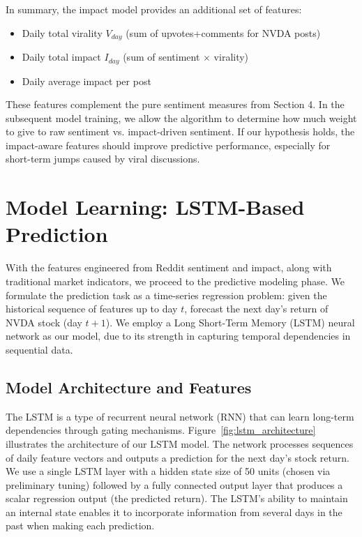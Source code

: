 \documentclass[conference]{IEEEtran}
\begin{document}
In summary, the impact model provides an additional set of features:
\begin{itemize}
	\item Daily total virality $V_{day}$ (sum of upvotes+comments for NVDA posts)
	\item Daily total impact $I_{day}$ (sum of sentiment $\times$ virality)
	\item Daily average impact per post
\end{itemize}
These features complement the pure sentiment measures from Section 4. In the subsequent model training, we allow the algorithm to determine how much weight to give to raw sentiment vs. impact-driven sentiment. If our hypothesis holds, the impact-aware features should improve predictive performance, especially for short-term jumps caused by viral discussions.

\section{Model Learning: LSTM-Based Prediction}
With the features engineered from Reddit sentiment and impact, along with traditional market indicators, we proceed to the predictive modeling phase. We formulate the prediction task as a time-series regression problem: given the historical sequence of features up to day $t$, forecast the next day’s return of NVDA stock (day $t+1$). We employ a Long Short-Term Memory (LSTM) neural network as our model, due to its strength in capturing temporal dependencies in sequential data.

\subsection{Model Architecture and Features}
The LSTM is a type of recurrent neural network (RNN) that can learn long-term dependencies through gating mechanisms. Figure~\ref{fig:lstm_architecture} illustrates the architecture of our LSTM model. The network processes sequences of daily feature vectors and outputs a prediction for the next day’s stock return. We use a single LSTM layer with a hidden state size of 50 units (chosen via preliminary tuning) followed by a fully connected output layer that produces a scalar regression output (the predicted return). The LSTM’s ability to maintain an internal state enables it to incorporate information from several days in the past when making each prediction.
\end{document}

